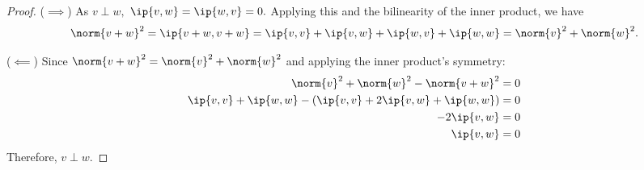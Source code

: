 \begin{proof}
    ($\implies$) As $v\perp w,$ $\ip{v,w}=\ip{w,v}=0.$ Applying this and the bilinearity of the inner product, we have $$\norm{v+w}^2 = \ip{v+w,v+w} = \ip{v,v} + \ip{v,w} + \ip{w,v} + \ip{w,w} = \norm{v}^2 + \norm{w}^2.$$

    ($\impliedby$) Since $\norm{v+w}^2 = \norm{v}^2 + \norm{w}^2$ and applying the inner product's symmetry:
    \begin{align*}
        \norm{v}^2 + \norm{w}^2 - \norm{v+w}^2 &= 0 \\
        \ip{v,v} + \ip{w,w} - \left(\ip{v,v} + 2\ip{v,w} + \ip{w,w}\right) &= 0 \\
        -2\ip{v,w} &= 0 \\
        \ip{v,w} &= 0
    \end{align*}
    Therefore, $v\perp w.$
\end{proof}